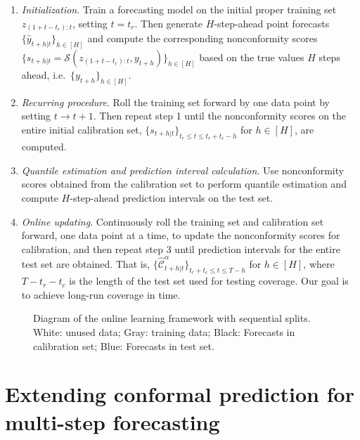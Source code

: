 \documentclass[
  11pt,
  12pt]{article}
\theoremstyle{plain}
\theoremstyle{remark}
\begin{document}
\begin{enumerate}
\def\labelenumi{\arabic{enumi}.}
\item
  \emph{Initialization}. Train a forecasting model on the initial proper
  training set \(z_{(1+t-t_r):t}\), setting \(t=t_r\). Then generate
  \(H\)-step-ahead point forecasts \(\{\hat{y}_{t+h|t}\}_{h\in[H]}\) and
  compute the corresponding nonconformity scores
  \(\{s_{t+h|t}=\mathcal{S}(z_{(1+t-t_r):t}, y_{t+h})\}_{h\in[H]}\)
  based on the true values \(H\) steps ahead,
  i.e.~\(\{y_{t+h}\}_{h\in[H]}\).
\item
  \emph{Recurring procedure}. Roll the training set forward by one data
  point by setting \(t \rightarrow t+1\). Then repeat step 1 until the
  nonconformity scores on the entire initial calibration set,
  \(\{s_{t+h|t}\}_{t_r \leq t \leq t_r+t_c-h}\) for \(h\in[H]\), are
  computed.
\item
  \emph{Quantile estimation and prediction interval calculation}. Use
  nonconformity scores obtained from the calibration set to perform
  quantile estimation and compute \(H\)-step-ahead prediction intervals
  on the test set.
\item
  \emph{Online updating}. Continuously roll the training set and
  calibration set forward, one data point at a time, to update the
  nonconformity scores for calibration, and then repeat step 3 until
  prediction intervals for the entire test set are obtained. That is,
  \(\{\hat{\mathcal{C}}_{t+h|t}^{\alpha}\}_{t_r+t_c \leq t \leq T-h}\)
  for \(h \in [H]\), where \(T-t_r-t_c\) is the length of the test set
  used for testing coverage. Our goal is to achieve long-run coverage in
  time.
\end{enumerate}

\begin{figure}[!hbtp]
\vspace*{-1.5cm}
\hspace*{-2.5cm}

\vspace*{-1.0cm}

\caption{Diagram of the online learning framework with sequential splits. White: unused data; Gray: training data; Black: Forecasts in calibration set; Blue: Forecasts in test set.}\label{fig-flowchart}
\end{figure}

\section{Extending conformal prediction for multi-step
forecasting}\label{sec-ext}
\end{document}
